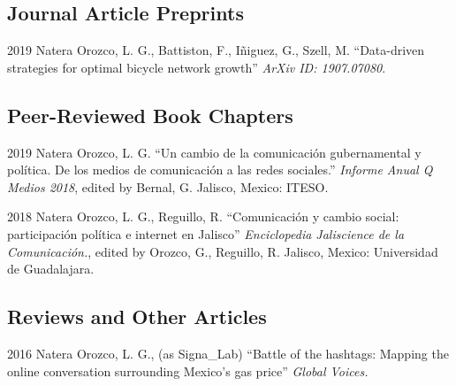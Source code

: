 \documentclass{academiccv}
\begin{document}



\subsection*{Journal Article Preprints}
\begin{tablist}

\item[2019] \tab Natera Orozco, L. G., Battiston, F., I\~niguez, G., Szell, M. \enquote{Data-driven strategies for optimal bicycle network growth} \textit{ArXiv ID: 1907.07080}. 

\end{tablist}



\subsection*{Peer-Reviewed Book Chapters}

\begin{tablist}

\item[2019] \tab Natera Orozco, L. G. \enquote{Un cambio de la comunicación gubernamental y política. De los medios de comunicación a las redes sociales.} \textit{Informe Anual Q Medios 2018}, edited by Bernal, G. Jalisco, Mexico: ITESO.

\item[2018] \tab Natera Orozco, L. G., Reguillo, R. \enquote{Comunicación y cambio social: participación política e internet en Jalisco} \textit{Enciclopedia Jaliscience de la Comunicación.}, edited by Orozco, G., Reguillo, R. Jalisco, Mexico: Universidad de Guadalajara.

\end{tablist}

\subsection*{Reviews and Other Articles}

\begin{tablist}

\item[2016] \tab Natera Orozco, L. G., (as Signa\_Lab) \enquote{Battle of the hashtags: Mapping the online conversation surrounding Mexico's gas price} \textit{Global Voices.}

\end{tablist}
\end{document}
